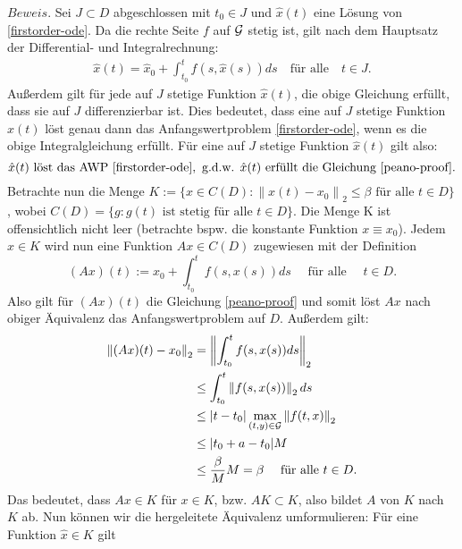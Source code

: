 $Beweis.$ Sei $J\subset D$ abgeschlossen mit $t_0 \in J$ und $\hat{x}(t)$ eine Lösung von \eqref{firstorder-ode}.
Da die rechte Seite $f$ auf ${\cal G}$ stetig ist, gilt nach dem Hauptsatz der Differential- und Integralrechnung:
\begin{align}
    \hat{x}(t) = \hat{x}_0 + \int_{t_0}^{t} f(s, \hat{x}(s)) ds \quad \text{für alle} \quad t \in J.
    \label{peano-proof}
\end{align}
Außerdem gilt für jede auf $J$ stetige Funktion $\hat{x}(t)$, die obige Gleichung erfüllt, dass sie auf $J$
differenzierbar ist. Dies bedeutet, dass eine auf $J$ stetige Funktion $\hat{x}(t)$ löst genau dann das
Anfangswertproblem \eqref{firstorder-ode}, wenn es die obige Integralgleichung erfüllt. Für eine auf $J$ stetige
Funktion $\hat{x}(t)$ gilt also:
\[
    \hat{x}(t) \text{ löst das AWP \eqref{firstorder-ode}}, \text{ g.d.w. } \hat{x}(t)
    \text{ erfüllt die Gleichung } \eqref{peano-proof}.
\]
Betrachte nun die Menge $K := \{ x \in C(D): \left\lVert x(t) - x_0 \right\rVert_2 \leq \beta \text{ für alle }
t \in D \}$, wobei \linebreak $C(D)=\{g: g(t) \text{ ist stetig für alle } t \in D \}$. Die Menge K ist offensichtlich nicht
leer (betrachte bspw. die konstante Funktion $x \equiv x_0$). Jedem $x \in K$ wird nun eine Funktion $Ax \in C(D)$ zugewiesen
mit der Definition
\[
    (Ax)(t) := x_0 + \int_{t_0}^{t} f(s, x(s)) ds \quad \text{ für alle } \quad t \in D.
\]
Also gilt für $(Ax)(t)$ die Gleichung \eqref{peano-proof} und somit löst $Ax$ nach obiger Äquivalenz das
Anfangswertproblem auf $D$. Außerdem gilt:
\begin{align*}
    \left\lVert (Ax)(t) - x_0 \right\rVert_2 &= \left\lVert \int_{t_0}^{t} f(s, x(s)) ds \right\rVert_2 \\
    &\leq \int_{t_0}^{t} \left\lVert f(s, x(s)) \right\rVert_2 ds \\
    &\leq |t - t_0| \max_{(t,y)\in {\cal G}}\left\lVert f(t,x)\right\rVert_2 \\
    &\leq |t_0 + a - t_0| M \\
    &\leq \frac{\beta}{M}M = \beta \quad \text{ für alle } t \in D.
\end{align*}
Das bedeutet, dass $Ax \in K$ für $x \in K$, bzw. $AK \subset K$, also bildet $A$ von $K$ nach $K$ ab. Nun können wir die
hergeleitete Äquivalenz umformulieren: Für eine Funktion $\hat{x} \in K$ gilt
